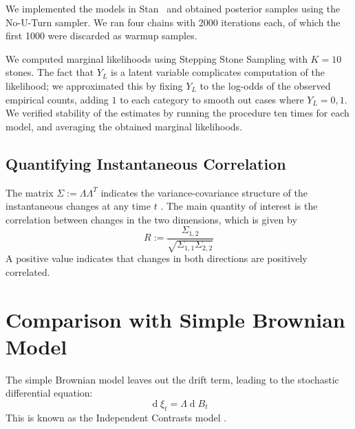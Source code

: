 \documentclass[11pt,a4paper]{article}
\begin{document}
We implemented the models in Stan~\citep{carpenter2017stan} and obtained posterior samples using the No-U-Turn sampler.
We ran four chains with 2000 iterations each, of which the first 1000 were discarded as warmup samples.

We computed marginal likelihoods using Stepping Stone Sampling \citep{xie2011improving} with $K=10$ stones.
The fact that $Y_L$ is a latent variable complicates computation of the likelihood; we approximated this by fixing $Y_L$ to the log-odds of the observed empirical counts, adding $1$ to each category to smooth out cases where $Y_L =0,1$.
We verified stability of the estimates by running the procedure ten times for each model, and averaging the obtained marginal likelihoods.


\subsection{Quantifying Instantaneous Correlation}
The matrix $\Sigma := \Lambda\Lambda^T$ indicates the variance-covariance structure of the instantaneous changes at any time $t$ \citep{felsenstein1973maximum, freckleton2012fast}.
The main quantity of interest is the correlation between changes in the two dimensions, which is given by
\begin{equation}
R := \frac{\Sigma_{1,2}}{\sqrt{\Sigma_{1,1}\Sigma_{2,2}}}
\end{equation}
A positive value indicates that changes in both directions are positively correlated.




\section{Comparison with Simple Brownian Model}

The simple Brownian model leaves out the drift term, leading to the stochastic differential equation:
\begin{equation*}
    \operatorname{d}\xi_t = \Lambda \operatorname{d}B_t
\end{equation*}
This is known as the Independent Contrasts model \citep{felsenstein1973maximum, freckleton2012fast}.
\end{document}
